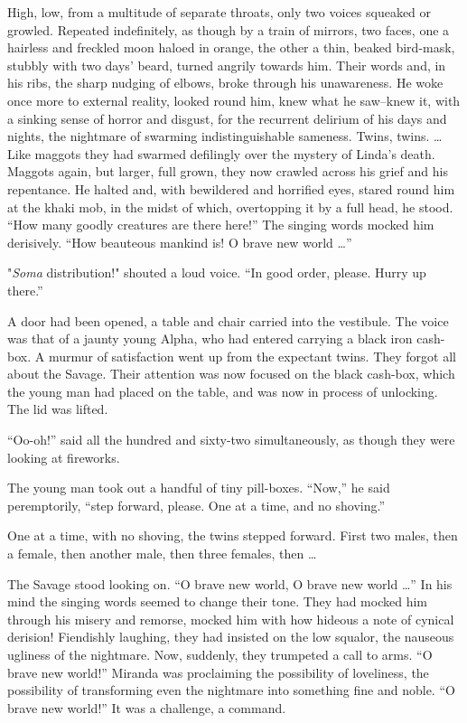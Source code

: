 \documentclass[12pt]{report}
\begin{document}
High, low, from a multitude of separate throats, only two voices
squeaked or growled. Repeated indefinitely, as though by a train of
mirrors, two faces, one a hairless and freckled moon haloed in orange,
the other a thin, beaked bird-mask, stubbly with two days' beard, turned
angrily towards him. Their words and, in his ribs, the sharp nudging of
elbows, broke through his unawareness. He woke once more to external
reality, looked round him, knew what he saw--knew it, with a sinking
sense of horror and disgust, for the recurrent delirium of his days and
nights, the nightmare of swarming indistinguishable sameness. Twins,
twins. \ldots{} Like maggots they had swarmed defilingly over the
mystery of Linda's death. Maggots again, but larger, full grown, they
now crawled across his grief and his repentance. He halted and, with
bewildered and horrified eyes, stared round him at the khaki mob, in the
midst of which, overtopping it by a full head, he stood. ``How many
goodly creatures are there here!'' The singing words mocked him
derisively. ``How beauteous mankind is! O brave new world \ldots{}''

"\emph{Soma} distribution!" shouted a loud voice. ``In good order,
please. Hurry up there.''

A door had been opened, a table and chair carried into the vestibule.
The voice was that of a jaunty young Alpha, who had entered carrying a
black iron cash-box. A murmur of satisfaction went up from the expectant
twins. They forgot all about the Savage. Their attention was now focused
on the black cash-box, which the young man had placed on the table, and
was now in process of unlocking. The lid was lifted.

``Oo-oh!'' said all the hundred and sixty-two simultaneously, as though
they were looking at fireworks.

The young man took out a handful of tiny pill-boxes. ``Now,'' he said
peremptorily, ``step forward, please. One at a time, and no shoving.''

One at a time, with no shoving, the twins stepped forward. First two
males, then a female, then another male, then three females, then
\ldots{}

The Savage stood looking on. ``O brave new world, O brave new world
\ldots{}'' In his mind the singing words seemed to change their tone.
They had mocked him through his misery and remorse, mocked him with how
hideous a note of cynical derision! Fiendishly laughing, they had
insisted on the low squalor, the nauseous ugliness of the nightmare.
Now, suddenly, they trumpeted a call to arms. ``O brave new world!''
Miranda was proclaiming the possibility of loveliness, the possibility
of transforming even the nightmare into something fine and noble. ``O
brave new world!'' It was a challenge, a command.
\end{document}
